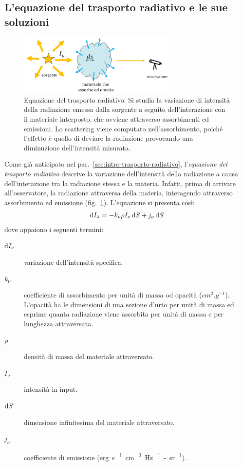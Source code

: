 \subsection{L'equazione del trasporto radiativo e le sue soluzioni}\label{sec:trasporto-radiativo}\label{sec:soluzioni-trasporto-radiativo}

\begin{figure}
\centering
\includegraphics[width=0.7\textwidth]{immagini/trasporto-radiativo.png}
\caption{Equazione del trasporto radiativo. Si studia la variazione di intensità della radiazione emessa dalla sorgente a seguito dell'interazione con il materiale interposto, che avviene attraverso assorbimenti ed emissioni. Lo scattering viene computato nell'assorbimento, poiché l'effetto è quello di deviare la radiazione provocando una diminuzione dell'intensità misurata.}
\label{fig:trasporto-radiativo}
\end{figure}

Come già anticipato nel par.~\ref{sec:intro-trasporto-radiativo}, l'\emph{equazione del trasporto radiativo} descrive la variazione dell'intensità della radiazione a causa dell'interazione tra la radiazione stessa e la materia. Infatti, prima di arrivare all'osservatore, la radiazione attraversa della materia, interagendo attraverso assorbimento ed emissione (fig.~\ref{fig:trasporto-radiativo}). L'equazione si presenta così:
\begin{equation}\label{eq:trasporto-radiativo}
    \mathop{\mathrm{{}d}}\mathopen{} I_\lambda = - k_\nu \rho I_\nu \mathop{\mathrm{{}d}}\mathopen{} S + j_\nu \mathop{\mathrm{{}d}}\mathopen{} S
\end{equation}
dove appaiono i seguenti termini:
\begin{description}
    \item[$\mathop{\mathrm{{}d}}\mathopen{} I_\nu$] variazione dell'intensità specifica.
    \item[$k_\nu$] coefficiente di assorbimento per unità di massa od opacità ($\si{cm^2.g^{-1}}$). L'opacità ha le dimensioni di una sezione d'urto per unità di massa ed esprime quanta radiazione viene assorbita per unità di massa e per lunghezza attraversata.
    \item[$\rho$] densità di massa del materiale attraversato.
    \item[$I_\nu$] intensità in input.
    \item[$\mathop{\mathrm{{}d}}\mathopen{} S$] dimensione infinitesima del materiale attraversato.
    \item[$j_\nu$] coefficiente di emissione (\si{erg.s^{-1}.cm^{-3}.Hz^{-1}-sr^{-1}}).
\end{description}

